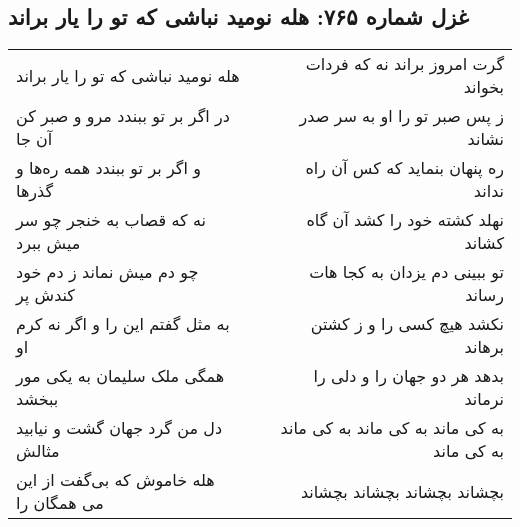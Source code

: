 \begin{center}
\section*{غزل شماره ۷۶۵: هله نومید نباشی که تو را یار براند}
\label{sec:0765}
\begin{longtable}{l p{0.5cm} r}
هله نومید نباشی که تو را یار براند
&&
گرت امروز براند نه که فردات بخواند
\\
در اگر بر تو ببندد مرو و صبر کن آن جا
&&
ز پس صبر تو را او به سر صدر نشاند
\\
و اگر بر تو ببندد همه ره‌ها و گذرها
&&
ره پنهان بنماید که کس آن راه نداند
\\
نه که قصاب به خنجر چو سر میش ببرد
&&
نهلد کشته خود را کشد آن گاه کشاند
\\
چو دم میش نماند ز دم خود کندش پر
&&
تو ببینی دم یزدان به کجا هات رساند
\\
به مثل گفتم این را و اگر نه کرم او
&&
نکشد هیچ کسی را و ز کشتن برهاند
\\
همگی ملک سلیمان به یکی مور ببخشد
&&
بدهد هر دو جهان را و دلی را نرماند
\\
دل من گرد جهان گشت و نیابید مثالش
&&
به کی ماند به کی ماند به کی ماند به کی ماند
\\
هله خاموش که بی‌گفت از این می همگان را
&&
بچشاند بچشاند بچشاند بچشاند
\\
\end{longtable}
\end{center}
